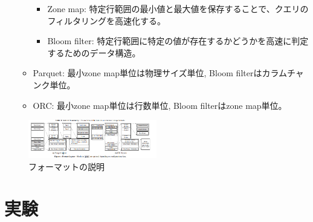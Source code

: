 \documentclass[uplatex]{jsarticle}
\theoremstyle{remark}
\begin{document}
\begin{itemize}
\begin{itemize}
    \begin{itemize}
      \item Zone map: 特定行範囲の最小値と最大値を保存することで、クエリのフィルタリングを高速化する。
      \item Bloom filter: 特定行範囲に特定の値が存在するかどうかを高速に判定するためのデータ構造。
    \end{itemize}
    \item Parquet: 最小zone map単位は物理サイズ単位, Bloom filterはカラムチャンク単位。
    \item ORC: 最小zone map単位は行数単位, Bloom filterはzone map単位。
  \end{itemize}
\end{itemize}

\begin{figure}
  \centering
  \includegraphics[width=0.5\textwidth]{img/columnar_storage_format_format.png}
  \caption{フォーマットの説明}
  \label{fig:storage-format}
\end{figure}

\section{実験}
\end{document}
